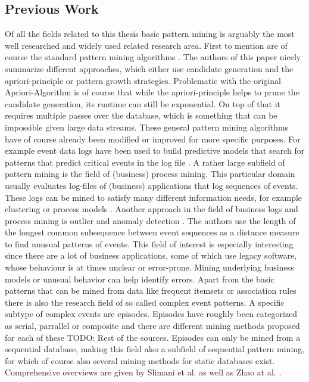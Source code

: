 \documentclass[journal]{IEEEtran}
\begin{document}
\subsection{Previous Work}
Of all the fields related to this thesis basic pattern mining is arguably the most well researched and widely used related research area. First to mention are of course the standard pattern mining algorithms \cite{han2007frequent}. The authors of this paper nicely summarize different approaches, which either use candidate generation and the apriori-principle or pattern growth strategies. Problematic with the original Apriori-Algorithm is of course that while the apriori-principle helps to prune the candidate generation, its runtime can still be exponential. On top of that it requires multiple passes over the database, which is something that can be impossible given large data streams. These general pattern mining algorithms have of course already been modified or improved for more specific purposes. For example event data logs have been used to build predictive models that search for patterns that predict critical events in the log file \cite{predictCritical}. \newline
A rather large subfield of pattern mining is the field of (business) process mining. This particular domain usually evaluates log-files of (business) applications that log sequences of events. These logs can be mined to satisfy many different information needs, for example clustering \cite{logcluster} or process models \cite{processMining}.
Another approach in the field of business logs and process mining is outlier and anomaly detection \cite{anomaly}. The authors use the length of the longest common subsequence between event sequences as a distance measure to find unusual patterns of events. This field of interest is especially interesting since there are a lot of business applications, some of which use legacy software, whose behaviour is at times unclear or error-prone. Mining underlying business models or unusual behavior can help identify errors. \newline
Apart from the basic patterns that can be mined from data like frequent itemsets or association rules there is also the research field of so called complex event patterns. A specific subtype of complex events are episodes.
Episodes have roughly been categorized as serial, parrallel or composite and there are different mining methods proposed for each of these \cite{closedEpisodeMining} TODO: Rest of the sources.
 Episodes can only be mined from a sequential database, making this field also a subfield of sequential pattern mining, for which of course also several mining methods for static databases exist. Comprehensive overviews are given by Slimani et al. \cite{sequentialPatternMining} as well as Zhao at al. \cite{sequentialPatternMining}.
\end{document}
